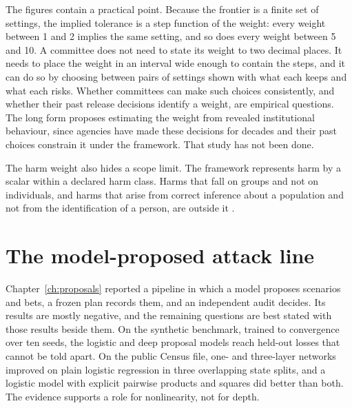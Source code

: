 The figures contain a practical point. Because the frontier is a finite set of
settings, the implied tolerance is a step function of the weight: every weight between
1 and 2 implies the same setting, and so does every weight between 5 and 10. A
committee does not need to state its weight to two decimal places. It needs to place
the weight in an interval wide enough to contain the steps, and it can do so by
choosing between pairs of settings shown with what each keeps and what each risks.
Whether committees can make such choices consistently, and whether their past release
decisions identify a weight, are empirical questions. The long form proposes estimating
the weight from revealed institutional behaviour, since agencies have made these
decisions for decades and their past choices constrain it under the framework. That
study has not been done.

The harm weight also hides a scope limit. The framework represents harm by a scalar
within a declared harm class. Harms that fall on groups and not on individuals, and
harms that arise from correct inference about a population and not from the
identification of a person, are outside it \citep{skinner2012,dwork2014}.

\section{The model-proposed attack line}

Chapter~\ref{ch:proposals} reported a pipeline in which a model proposes scenarios and
bets, a frozen plan records them, and an independent audit decides. Its results are
mostly negative, and the remaining questions are best stated with those results
beside them. On the synthetic benchmark, trained to convergence over ten seeds, the
logistic and deep proposal models reach held-out losses that cannot be told apart.
On the public Census file, one- and three-layer networks improved on plain logistic
regression in three overlapping state splits, and a logistic model with explicit
pairwise products and squares did better than both.
The evidence supports a role for nonlinearity, not for depth.

